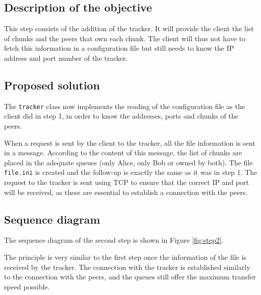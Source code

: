 \subsection{Description of the objective}

This step consists of the addition of the tracker. It will provide the client the list of chunks and the peers that own each chunk. The client will thus not have to fetch this information in a configuration file but still needs to know the IP address and port number of the tracker.

\subsection{Proposed solution}

The \texttt{tracker} class now implements the reading of the configuration file as the client did in step 1, in order to know the addresses, ports and chunks of the peers.

When a request is sent by the client to the tracker, all the file information is sent in a message. According to the content of this message, the list of chunks are placed in the adequate queues (only Alice, only Bob or owned by both). The file {\tt file.ini} is created and the follow-up is exactly the same as it was in step 1. The request to the tracker is sent using TCP to ensure that the correct IP and port will be received, as these are essential to establish a connection with the peers.

\subsection{Sequence diagram}

The sequence diagram of the second step is shown in Figure \ref{fig:step2}.

The principle is very similar to the first step once the information of the file is received by the tracker. The connection with the tracker is established similarly to the connection with the peers, and the queues still offer the maximum transfer speed possible.

